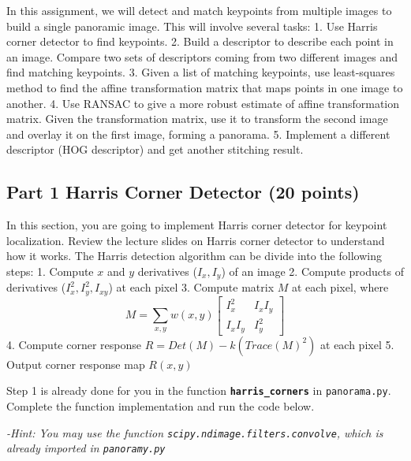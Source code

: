 \documentclass[11pt]{article}
\begin{document}
In this assignment, we will detect and match keypoints from multiple
images to build a single panoramic image. This will involve several
tasks: 1. Use Harris corner detector to find keypoints. 2. Build a
descriptor to describe each point in an image. Compare two sets of
descriptors coming from two different images and find matching
keypoints. 3. Given a list of matching keypoints, use least-squares
method to find the affine transformation matrix that maps points in one
image to another. 4. Use RANSAC to give a more robust estimate of affine
transformation matrix. Given the transformation matrix, use it to
transform the second image and overlay it on the first image, forming a
panorama. 5. Implement a different descriptor (HOG descriptor) and get
another stitching result.

    \hypertarget{part-1-harris-corner-detector-20-points}{%
\subsection{Part 1 Harris Corner Detector (20
points)}\label{part-1-harris-corner-detector-20-points}}

In this section, you are going to implement Harris corner detector for
keypoint localization. Review the lecture slides on Harris corner
detector to understand how it works. The Harris detection algorithm can
be divide into the following steps: 1. Compute \(x\) and \(y\)
derivatives (\(I_x, I_y\)) of an image 2. Compute products of
derivatives (\(I_x^2, I_y^2, I_{xy}\)) at each pixel 3. Compute matrix
\(M\) at each pixel, where \[
M = \sum_{x,y} w(x,y)
    \begin{bmatrix}
        I_{x}^2 & I_{x}I_{y} \\
        I_{x}I_{y} & I_{y}^2
    \end{bmatrix}
\] 4. Compute corner response \(R=Det(M)-k(Trace(M)^2)\) at each pixel
5. Output corner response map \(R(x,y)\)

Step 1 is already done for you in the function
\textbf{\texttt{harris\_corners}} in \texttt{panorama.py}. Complete the
function implementation and run the code below.

\emph{-Hint: You may use the function
\texttt{scipy.ndimage.filters.convolve}, which is already imported in
\texttt{panoramy.py}}
\end{document}
